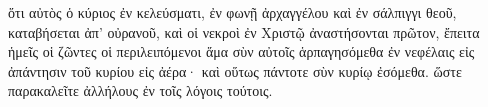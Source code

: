 \documentclass{openreader}
\begin{document}
ὅτι αὐτὸς ὁ κύριος ἐν κελεύσματι, ἐν φωνῇ ἀρχαγγέλου καὶ ἐν σάλπιγγι θεοῦ, καταβήσεται ἀπ’ οὐρανοῦ, καὶ οἱ νεκροὶ ἐν Χριστῷ ἀναστήσονται πρῶτον, 
ἔπειτα ἡμεῖς οἱ ζῶντες οἱ περιλειπόμενοι ἅμα σὺν αὐτοῖς ἁρπαγησόμεθα ἐν νεφέλαις εἰς ἀπάντησιν τοῦ κυρίου εἰς ἀέρα· καὶ οὕτως πάντοτε σὺν κυρίῳ ἐσόμεθα. 
ὥστε παρακαλεῖτε ἀλλήλους ἐν τοῖς λόγοις τούτοις. 
\end{document}
